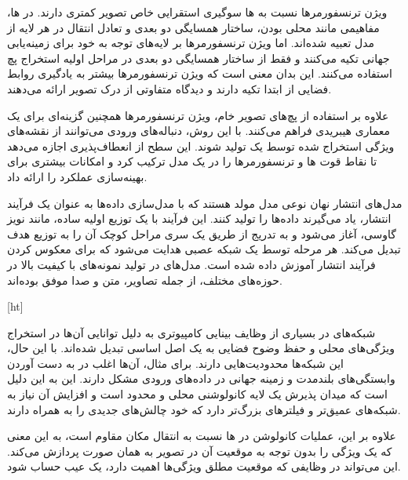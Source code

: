ویژن ترنسفورمرها نسبت به  ها سوگیری استقرایی خاص تصویر کمتری دارند. در  ها، مفاهیمی مانند محلی بودن، ساختار همسایگی دو بعدی و تعادل انتقال در هر لایه از مدل تعبیه شده‌اند. اما ویژن ترنسفورمرها بر لایه‌های توجه به خود برای زمینه‌یابی جهانی تکیه می‌کنند و فقط از ساختار همسایگی دو بعدی در مراحل اولیه استخراج پچ استفاده می‌کنند. این بدان معنی است که ویژن ترنسفورمرها بیشتر به یادگیری روابط فضایی از ابتدا تکیه دارند و دیدگاه متفاوتی از درک تصویر ارائه می‌دهند.


علاوه بر استفاده از پچ‌های تصویر خام، ویژن ترنسفورمرها همچنین گزینه‌ای برای یک معماری هیبریدی فراهم می‌کنند. با این روش، دنباله‌های ورودی می‌توانند از نقشه‌های ویژگی استخراج شده توسط یک  تولید شوند. این سطح از انعطاف‌پذیری اجازه می‌دهد تا نقاط قوت  ها و ترنسفورمرها را در یک مدل ترکیب کرد و امکانات بیشتری برای بهینه‌سازی عملکرد را ارائه داد.




مدل‌های انتشار نهان نوعی مدل مولد هستند که با مدل‌سازی داده‌ها به عنوان یک فرآیند انتشار، یاد می‌گیرند داده‌ها را تولید کنند. این فرآیند با یک توزیع اولیه ساده، مانند نویز گاوسی، آغاز می‌شود و به تدریج از طریق یک سری مراحل کوچک آن را به توزیع هدف تبدیل می‌کند. هر مرحله توسط یک شبکه عصبی هدایت می‌شود که برای معکوس کردن فرآیند انتشار آموزش داده شده است. مدل‌های  در تولید نمونه‌های با کیفیت بالا در حوزه‌های مختلف، از جمله تصاویر، متن و صدا موفق بوده‌اند. 


[ht]








شبکه‌های  در بسیاری از وظایف بینایی کامپیوتری به دلیل توانایی آن‌ها در استخراج ویژگی‌های محلی و حفظ وضوح فضایی به یک اصل اساسی تبدیل شده‌اند. با این حال، این شبکه‌ها محدودیت‌هایی دارند. برای مثال، آن‌ها اغلب در به دست آوردن وابستگی‌های بلندمدت و زمینه جهانی در داده‌های ورودی مشکل دارند. این به این دلیل است که میدان پذیرش یک لایه کانولوشنی محلی و محدود است و افزایش آن نیاز به شبکه‌های عمیق‌تر و فیلترهای بزرگ‌تر دارد که خود چالش‌های جدیدی را به همراه دارند.

علاوه بر این، عملیات کانولوشن در ها نسبت به انتقال مکان مقاوم است، به این معنی که یک ویژگی را بدون توجه به موقعیت آن در تصویر به همان صورت پردازش می‌کند. این می‌تواند در وظایفی که موقعیت مطلق ویژگی‌ها اهمیت دارد، یک عیب حساب شود.





